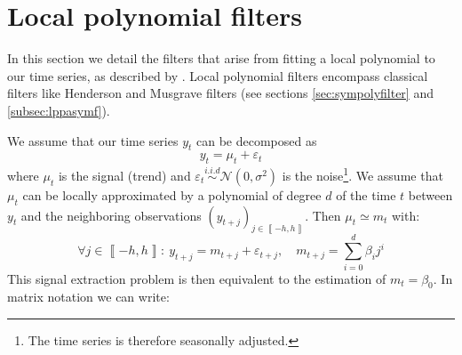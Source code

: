 \documentclass[
  12pt,
  ,
  a4paper]{article}
\newcommand\1{\mathds{1}}
\begin{document}
\hypertarget{sec:lppfilters}{%
\section{Local polynomial filters}\label{sec:lppfilters}}

In this section we detail the filters that arise from fitting a local polynomial to our time series, as described by \textcite{proietti2008}.
Local polynomial filters encompass classical filters like Henderson and Musgrave filters (see sections \ref{sec:sympolyfilter} and \ref{subsec:lppasymf}).

We assume that our time series \(y_t\) can be decomposed as
\[
y_t=\mu_t+\varepsilon_t
\]
where \(\mu_t\) is the signal (trend) and \(\varepsilon_{t}\overset{i.i.d}{\sim}\mathcal{N}(0,\sigma^{2})\) is the noise\footnote{The time series is therefore seasonally adjusted.}.
We assume that \(\mu_t\) can be locally approximated by a polynomial of degree \(d\) of the time \(t\) between \(y_t\) and the neighboring observations \(\left(y_{t+j}\right)_{j\in\left\llbracket -h,h\right\rrbracket}\).
Then \(\mu_t\simeq m_{t}\) with:
\[
\forall j\in\left\llbracket -h,h\right\rrbracket :\:
y_{t+j}=m_{t+j}+\varepsilon_{t+j},\quad m_{t+j}=\sum_{i=0}^{d}\beta_{i}j^{i}
\]
This signal extraction problem is then equivalent to the estimation of \(m_t=\beta_0\). In matrix notation we can write:
\end{document}
